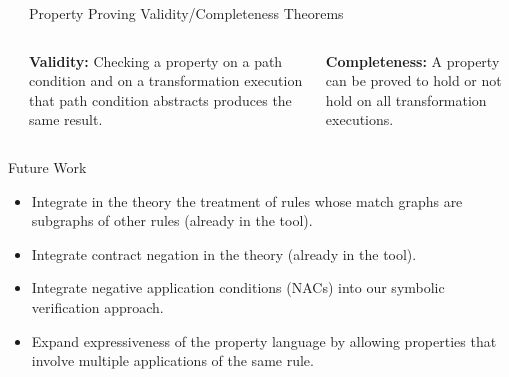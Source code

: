 \documentclass[final,hyperref={pdfpagelabels=false}]{beamer}
\begin{document}
\begin{frame}{}
\begin{columns}[t]
\begin{column}{.485\linewidth}
                \end{column} 
                \begin{column}{.485\linewidth}
       \begin{block}{Property Proving Validity/Completeness Theorems~\cite{LuVa2013a}}
                       \begin{columns}[t]
                       \begin{column}{.485\linewidth}
                     \textbf{Validity:}
                     \small{Checking a property on a path condition and on a transformation execution that path condition abstracts produces the same result.}
                     \end{column}
              		 \hspace{-2cm}                     
                     \vrule{}
               		 \hspace{.3cm}
                     \begin{column}{.485\linewidth}
                          \textbf{Completeness:}
                        \small{A property can be proved to hold or not hold on all transformation executions.}
      					\vspace{1.93cm} 
                        \end{column}
                       \end{columns}
                       \end{block}                    
      \end{column}
      \end{columns}
   
  
   \begin{columns}[t] 
    \begin{column}{.485\linewidth}
    	\begin{block}{Future Work}
   	   \begin{itemize}
   	   \item Integrate in the theory the treatment of rules whose match graphs are subgraphs of other rules (already in the tool).
   	   \item Integrate contract negation in the theory (already in the tool).
   	   \item Integrate negative application conditions (NACs) into our symbolic verification approach.
   	   \item Expand expressiveness of the property language by allowing properties that involve multiple applications of the same rule.
   	   \end{itemize}
        \end{block}
        

\end{column}
\end{columns}
\end{frame}
\end{document}
